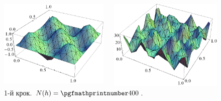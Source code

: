 \begin{frame}[allowframebreaks]
		\begin{figure}[H]
			 \begin{columns}
			 	\begin{column}{0.5\textwidth}
		     		\includegraphics[width=\textwidth]{problem1/my/solutions/1}
		     	\end{column}
		     	\begin{column}{0.5\textwidth}
		     		\includegraphics[width=\textwidth]{problem1/my/AEE/1}
		     	\end{column}
		     \end{columns}
		     \caption*{1-й крок. $N(h) = \nn{400}$.}
		\end{figure}


\end{frame}
